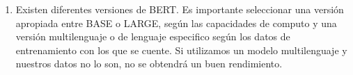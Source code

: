 \begin{enumerate}[label=\destacado{\arabic*.}]
  \item Existen diferentes versiones de BERT. Es importante seleccionar una versión apropiada entre BASE o LARGE, según las capacidades de computo y una versión multilenguaje o de lenguaje especifico según los datos de entrenamiento con los que se cuente. Si utilizamos un modelo multilenguaje  y nuestros datos no lo son, no se obtendrá un buen rendimiento. 

\end{enumerate}
